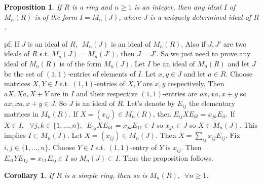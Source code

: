\documentclass[12pt,letterpaper]{report}
\newtheorem{proposition}{Proposition}[section]
\newtheorem{corollary}{Corollary}[section]
\begin{document}
\begin{proposition}If $R$ is a ring and $n\geq1$ is an integer, then any ideal $I$ of $M_{n}(R)$ is of the form $I=M_{n}(J)$, where $J$ is a uniquely determined ideal of $R$.\end{proposition}
pf. If $J$ is an ideal of $R,\,\,\,M_{n}(J)$ is an ideal of $M_{n}(R)$. Also if $J,J'$ are two ideals of $R$ s.t. $M_{n}(J)=M_{n}(J')$, then $J=J'$. So we just need to prove any ideal of $M_{n}(R)$ is of the form $M_{n}(J)$. Let $I$ be an ideal of $M_{n}(R)$ and let $J$ be the set of $(1,1)$-entries of elements of $I$. Let $x,y\in J$ and let $a\in R$. Choose matrices $X,Y\in I$ s.t. $(1,1)$-entries of $X,Y$ are $x,y$ respectively. Then $aX,Xa,X+Y$ are in $I$ and their respective $(1,1)$-entries are $ax,xa,x+y$ so $ax,xa,x+y\in J$. So $J$ is an ideal of $R$. Let's denote by $E_{ij}$ the elementary matrices in $M_{n}(R)$. If $X=(x_{ij})\in M_{n}(R)$, then $E_{ij}XE_{kl}=x_{jk}E_{il}$. If $X\in I,\,\,\,\,\forall j,k\in\{1,\dots,n\},\,\,\,E_{1j}XE_{k1}=x_{jk}E_{11}\in I$ so $x_{jk}\in J$ so $X\in M_{n}(J)$. This implies $I\subset M_{n}(J)$. Let $X=(x_{ij})\in M_{n}(J)$. Then $X=\sum_{ij}x_{ij}E_{ij}$. Fix $i,j\in\{1,\dots,n\}$. Choose $Y\in I$ s.t. $(1,1)$-entry of $Y$ is $x_{ij}$. Then $E_{i1}YE_{1j}=x_{11}E_{ij}\in I$ so $M_{n}(J)\subset I$. Thus the proposition follows. 
\begin{corollary}If $R$ is a simple ring, then so is $M_{n}(R),\,\,\,\forall n\geq1$.\end{corollary}
\end{document}
